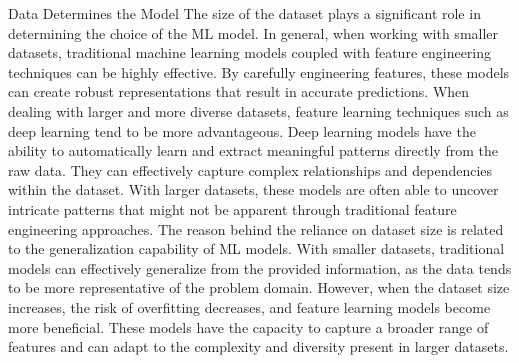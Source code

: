 \documentclass[9pt,bestpractices]{livecoms}
\begin{document}
	Data Determines the Model
The size of the dataset plays a significant role in determining the choice of the ML model. In general, when working with smaller datasets, traditional machine learning models coupled with feature engineering techniques can be highly effective. By carefully engineering features, these models can create robust representations that result in accurate predictions.
When dealing with larger and more diverse datasets, feature learning techniques such as deep learning tend to be more advantageous. Deep learning models have the ability to automatically learn and extract meaningful patterns directly from the raw data. They can effectively capture complex relationships and dependencies within the dataset. With larger datasets, these models are often able to uncover intricate patterns that might not be apparent through traditional feature engineering approaches.
The reason behind the reliance on dataset size is related to the generalization capability of ML models. With smaller datasets, traditional models can effectively generalize from the provided information, as the data tends to be more representative of the problem domain. However, when the dataset size increases, the risk of overfitting decreases, and feature learning models become more beneficial. These models have the capacity to capture a broader range of features and can adapt to the complexity and diversity present in larger datasets.
\end{document}
